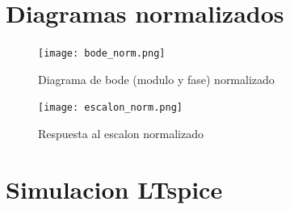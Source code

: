 \documentclass[11pt]{diazessay} %
\begin{document}
\newpage
\section*{Diagramas normalizados}
\begin{figure}[h]
\centering
	\texttt{[image: bode\_norm.png]}
\caption{Diagrama de bode (modulo y fase) normalizado}
\end{figure}

\begin{figure}[h]
\centering
	\texttt{[image: escalon\_norm.png]}
\caption{Respuesta al escalon normalizado}
\end{figure}

\newpage
\section*{Simulacion LTspice}
\end{document}
